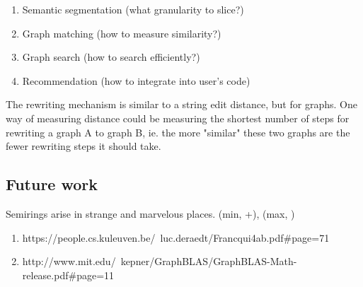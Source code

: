 \documentclass[11pt]{article}
\begin{document}
    \begin{enumerate}
    \item Semantic segmentation (what granularity to slice?)
    \item Graph matching (how to measure similarity?)
    \item Graph search (how to search efficiently?)
    \item Recommendation (how to integrate into user's code)
    \end{enumerate}

    The rewriting mechanism is similar to a string edit distance, but for graphs. One way of measuring distance could be measuring the shortest number of steps for rewriting a graph A to graph B, ie. the more "similar" these two graphs are the fewer rewriting steps it should take.

    \subsection{Future work}

    Semirings arise in strange and marvelous places. (min, +), (max, \times)

    \begin{enumerate}
    \item https://people.cs.kuleuven.be/~luc.deraedt/Francqui4ab.pdf#page=71
    \item http://www.mit.edu/~kepner/GraphBLAS/GraphBLAS-Math-release.pdf#page=11
    \end{enumerate}

    
    
\end{document}
